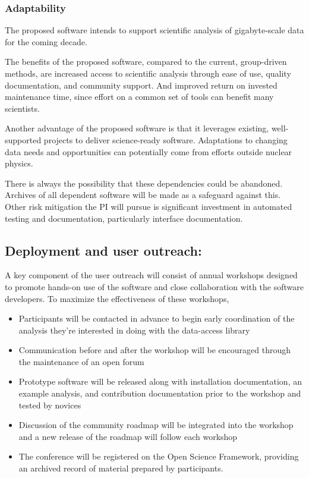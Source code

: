 \subsubsection*{Adaptability}
The proposed software intends to support scientific analysis of gigabyte-scale data for the coming decade.

The benefits of the proposed software, compared to the current, group-driven methods, are increased access to scientific analysis through ease of use, quality documentation, and community support.  And improved return on invested maintenance time, since effort on a common set of tools can benefit many scientists.

Another advantage of the proposed software is that it leverages existing, well-supported projects to deliver science-ready software.  Adaptations to changing data needs and opportunities can potentially come from efforts outside nuclear physics.

There is always the possibility that these dependencies could be abandoned.  Archives of all dependent software will be made as a safeguard against this.  Other risk mitigation the PI will pursue is significant investment in automated testing and documentation, particularly interface documentation.

\subsection{Deployment and user outreach:}
A key component of the user outreach will consist of annual workshops designed to promote hands-on use of the software and close collaboration with the software developers.  To maximize the effectiveness of these workshops,

\begin{itemize}
    \item Participants will be contacted in advance to begin early coordination of the analysis they're interested in doing with the data-access library
    \item Communication before and after the workshop will be encouraged through the maintenance of an open forum
    \item Prototype software will be released along with installation documentation, an example analysis, and contribution documentation prior to the workshop and tested by novices
    \item Discussion of the community roadmap will be integrated into the workshop and a new release of the roadmap will follow each workshop
    \item The conference will be registered on the Open Science Framework, providing an archived record of material prepared by participants.
\end{itemize}

